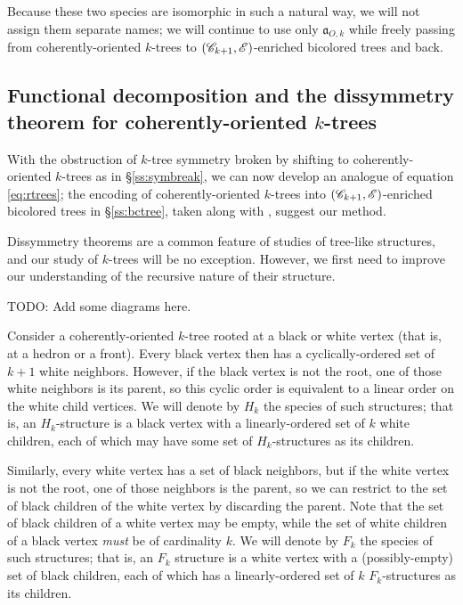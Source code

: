 \documentclass[sectionflow,singlespace,twoside,boldmathhdr]{brandiss} %
\numberwithin{section}{chapter}
\numberwithin{figure}{chapter}
\begin{document}
Because these two species are isomorphic in such a natural way, we will not assign them separate names; we will continue to use only $\mathfrak{a}_{O, k}$ while freely passing from coherently-oriented $k$-trees to $\left( {\mathscr{C}_{k+1}, \mathscr{E}} \right)$-enriched bicolored trees and back.

\subsection{Functional decomposition and the dissymmetry theorem for coherently-oriented $k$-trees}\label{ss:codecomp}
With the obstruction of $k$-tree symmetry broken by shifting to coherently-oriented $k$-trees as in \S \ref{ss:symbreak}, we can now develop an analogue of equation \eqref{eq:rtrees}; the encoding of coherently-oriented $k$-trees into $\left( {\mathscr{C}_{k+1}, \mathscr{E}} \right)$-enriched bicolored trees in \S \ref{ss:bctree}, taken along with \cite[\S 3.2]{bll:species}, suggest our method.

Dissymmetry theorems are a common feature of studies of tree-like structures, and our study of $k$-trees will be no exception.
However, we first need to improve our understanding of the recursive nature of their structure.

TODO: Add some diagrams here.

Consider a coherently-oriented $k$-tree rooted at a black or white vertex (that is, at a hedron or a front).
Every black vertex then has a cyclically-ordered set of $k+1$ white neighbors.
However, if the black vertex is not the root, one of those white neighbors is its parent, so this cyclic order is equivalent to a linear order on the white child vertices.
We will denote by $H_{k}$ the species of such structures; that is, an $H_{k}$-structure is a black vertex with a linearly-ordered set of $k$ white children, each of which may have some set of $H_{k}$-structures as its children.

Similarly, every white vertex has a set of black neighbors, but if the white vertex is not the root, one of those neighbors is the parent, so we can restrict to the set of black children of the white vertex by discarding the parent.
Note that the set of black children of a white vertex may be empty, while the set of white children of a black vertex \emph{must} be of cardinality $k$.
We will denote by $F_{k}$ the species of such structures; that is, an $F_{k}$ structure is a white vertex with a (possibly-empty) set of black children, each of which has a linearly-ordered set of $k$ $F_{k}$-structures as its children.
\end{document}
